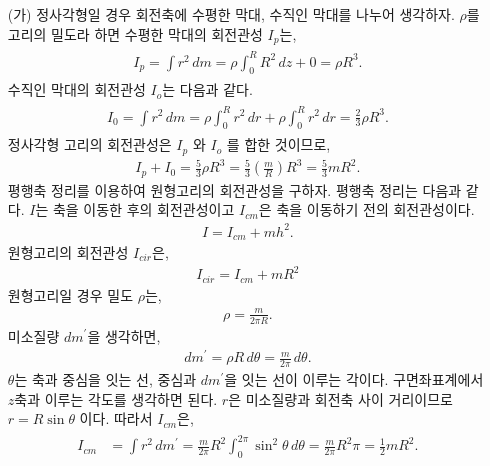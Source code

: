 \documentclass[floatfix,nofootinbib,superscriptaddress,fleqn]{revtex4-2}
\begin{document}
\begin{itemize}
  \item[(가)] 
  정사각형일 경우 회전축에 수평한 막대, 수직인 막대를 나누어 생각하자. 
  $\rho$를 고리의 밀도라 하면 수평한 막대의 회전관성 $I_{p}$는,
  \begin{align}
    \begin{split}
      I_{p} = \int r^2\,dm = \rho\int_0^R R^2\,dz + 0 = \rho R^3.  
    \end{split}
  \end{align}
  수직인 막대의 회전관성 $I_{o}$는 다음과 같다.
  \begin{align}
    \begin{split}
      I_{0} = \int r^2\,dm = \rho\int_0^R r^2\,dr+\rho\int_0^R r^2\,dr
      =\frac{2}{3}\rho R^3. 
    \end{split}
  \end{align}
  정사각형 고리의 회전관성은 $I_{p}$ 와 $I_{o}$ 를 합한 것이므로,
  \begin{align}
    I_{p}+I_{0} = \frac{5}{3}\rho R^3 
    = \frac{5}{3}\left(\frac{m}{R}\right) R^3
    =  \frac{5}{3}mR^2.
  \end{align}
  평행축 정리를 이용하여 원형고리의 회전관성을 구하자. 평행축 정리는 다음과 같다.
  $I$는 축을 이동한 후의 회전관성이고 $I_{cm}$은 축을 이동하기 전의 회전관성이다. 
  \begin{align}\label{eq:2-1}
    I = I_{cm}+mh^2.
  \end{align}
  원형고리의 회전관성 $I_{cir}$은,
  \begin{align}
    I_{cir} = I_{cm}+mR^2
  \end{align}
  원형고리일 경우 밀도 $\rho$는,
  \begin{align}
    \rho = \frac{m}{2\pi R}.
  \end{align}
  미소질량 $dm^\prime$을 생각하면,
  \begin{align}
    dm^\prime = \rho R\,d\theta = \frac{m}{2\pi}\,d\theta.
  \end{align}
  $\theta$는 축과 중심을 잇는 선, 중심과 $dm^\prime$을 잇는 선이 이루는 각이다.
  구면좌표계에서 $z$축과 이루는 각도를 생각하면 된다. $r$은 미소질량과 회전축 사이 
  거리이므로 $r=R\sin\theta$ 이다. 따라서 $I_{cm}$은,
  \begin{align}
    \begin{split}
      I_{cm} &= \int r^2\,dm^\prime = \frac{m}{2\pi}R^2
      \int_0^{2\pi}\sin^2\theta\,d\theta
      = \frac{m}{2\pi}R^2\pi = \frac{1}{2}mR^2.
    \end{split}

\end{align}
\end{itemize}
\end{document}
